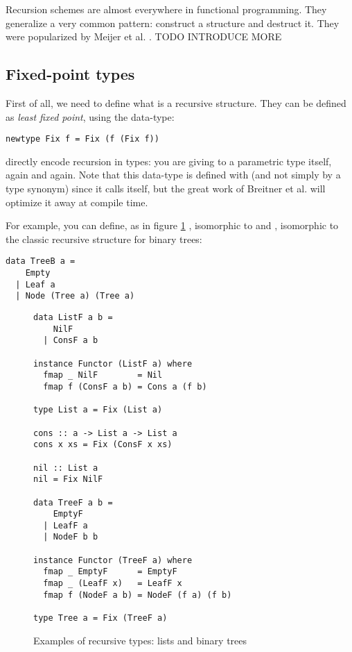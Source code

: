 
Recursion schemes are almost everywhere in functional programming. They generalize a very common pattern: construct a structure and destruct it. They were popularized by Meijer et al. \cite{4cec4a43c86444479dc0003182424795}. TODO INTRODUCE MORE

\subsection{Fixed-point types}
\label{subsec:defi}
First of all, we need to define what is a recursive structure. They can be defined as \emph{least fixed point}, using the  data-type:
\begin{verbatim}
newtype Fix f = Fix (f (Fix f))
\end{verbatim}
 directly encode recursion in types: you are giving to a parametric type itself, again and again. Note that this data-type is defined with  (and not simply by a type synonym) since it calls itself, but the great work of Breitner et al. \cite{Breitner:2014:SZC:2692915.2628141} will optimize it away at compile time.

For example, you can define, as in figure \ref{fig:listtree}
, isomorphic to \minline{[a]} and , isomorphic to the classic recursive structure for binary trees:
\begin{verbatim}
data TreeB a = 
    Empty 
  | Leaf a
  | Node (Tree a) (Tree a)
\end{verbatim}

\begin{figure}
\begin{verbatim}
data ListF a b =
    NilF
  | ConsF a b
  
instance Functor (ListF a) where
  fmap _ NilF        = Nil
  fmap f (ConsF a b) = Cons a (f b)

type List a = Fix (List a)

cons :: a -> List a -> List a
cons x xs = Fix (ConsF x xs)

nil :: List a
nil = Fix NilF

data TreeF a b =
    EmptyF
  | LeafF a
  | NodeF b b

instance Functor (TreeF a) where
  fmap _ EmptyF      = EmptyF
  fmap _ (LeafF x)   = LeafF x
  fmap f (NodeF a b) = NodeF (f a) (f b)

type Tree a = Fix (TreeF a)
\end{verbatim}
\caption{Examples of recursive types: lists and binary trees}
\label{fig:listtree}
\end{figure}


